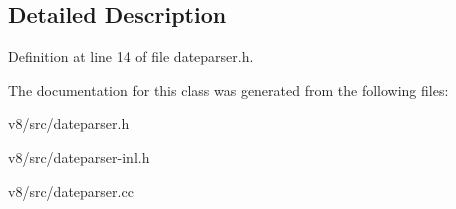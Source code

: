 \subsection{Detailed Description}


Definition at line 14 of file dateparser.\+h.



The documentation for this class was generated from the following files\+:\begin{DoxyCompactItemize}
\item 
v8/src/dateparser.\+h\item 
v8/src/dateparser-\/inl.\+h\item 
v8/src/dateparser.\+cc\end{DoxyCompactItemize}

